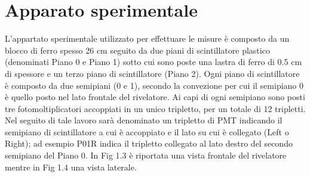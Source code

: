 \documentclass{standalone}
\begin{document}
\section{Apparato sperimentale}
L'appartato sperimentale utilizzato per effettuare le misure è composto da un blocco di ferro spesso 26 cm seguito da due piani di scintillatore plastico (denominati Piano 0 e Piano 1) sotto cui sono poste una lastra di ferro di 0.5 cm di spessore e un terzo piano di scintillatore (Piano 2).
Ogni piano di scintillatore è composto da due semipiani (0 e 1), secondo la convezione per cui il semipiano 0 è quello posto nel lato frontale del rivelatore. Ai capi di ogni semipiano sono posti tre fotomoltiplicatori accoppiati in un unico tripletto, per un totale di 12 tripletti. Nel seguito di tale lavoro sarà denominato un tripletto di PMT indicando il semipiano di scintillatore a cui è accoppiato e il lato su cui è collegato (Left o Right); ad esempio P01R indica il tripletto collegato al lato destro del secondo semipiano del Piano 0.
In Fig 1.3 è riportata una vista frontale del rivelatore mentre in Fig 1.4 una vista laterale.
\clearpage
\end{document}
